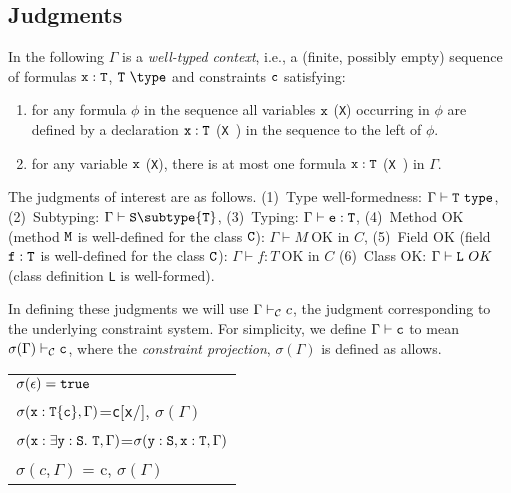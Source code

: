 

\subsection{Judgments}

In the following $\Gamma$ is a {\em well-typed context}, i.e., a
(finite, possibly empty) sequence of formulas $\tt x:T$, $\tt T\
\type$ and constraints $\tt c$ satisfying:
\begin{enumerate}
  \item for any formula $\phi$ in the sequence all variables $\tt x$
    ({\tt X}) occurring in $\phi$ are defined by a declaration $\tt
    x:T$ ({\tt X\ \type}) in the sequence to the left of $\phi$.

  \item for any variable $\tt x$ ({\tt X}), there is at most one
  formula $\tt x:T$ ({\tt X\ \type})  in $\Gamma$.
\end{enumerate}

The judgments of interest are as follows. 
(1)~Type well-formedness:  $\Gamma \vdash {\tt T} \ {\tt type}$,
(2)~Subtyping: $\Gamma \vdash {\tt S} \subtype {\tt T}$,
(3)~Typing:   $\Gamma   \vdash {\tt e:T}$,
(4)~Method OK (method $\tt M$ is well-defined for the class $\tt C$): $\Gamma \vdash M\ \mbox{OK in $C$}$,
(5)~Field OK (field $\tt f:T$ is well-defined for the class $\tt
   C$): $\Gamma \vdash f:T\ \mbox{OK in $C$}$
(6)~Class OK: $\Gamma \vdash {\tt L} \ OK$ (class definition {\tt L} is well-formed). 

In defining these judgments we will use $\Gamma \vdash_{\cal C} c$,
the judgment corresponding to the underlying constraint system. For
simplicity, we define $\Gamma \vdash {\tt c}$ to mean
$\sigma(\Gamma)\vdash_{\cal C} {\tt c}$, where the {\em constraint
projection}, $\sigma(\Gamma)$ is defined as allows. 

\begin{tabular}{l}
$\sigma(\epsilon)={\tt true}$\\
$\sigma({\tt x}:{\tt T\{c\}}, \Gamma)$={\tt c}[{\tt x}/\self], $\sigma(\Gamma)$\\
$\sigma({\tt x}:\exists {\tt y}:{\tt S}.~{\tt T}, \Gamma)$=$\sigma({\tt y:S}, {\tt x}:{\tt T},\Gamma)$\\
$\sigma(c,\Gamma)$ = c, $\sigma(\Gamma)$
\end{tabular}

